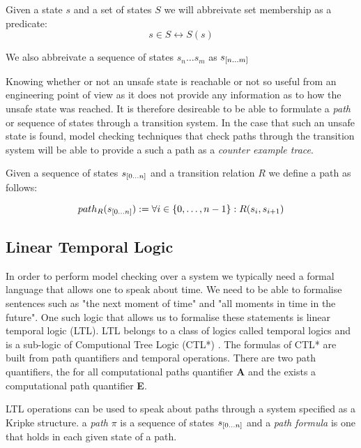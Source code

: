 \begin{myremark}
Given a state $s$ and a set of states $S$ we will abbreivate set membership as a predicate:
 $$s \in S \leftrightarrow S(s)$$

We also  abbreivate  a sequence of states $s_n \ldots s_m$ as $s_{{[}n \ldots m {]}}$

\end{myremark}
\medskip
Knowing whether or not an unsafe state is reachable or not so useful from an engineering point of view as it does not provide any information as to how the unsafe state was reached. It is therefore desireable to be able to formulate a \emph{path} or sequence of states through a transition system. In the case that such an unsafe state is found, model checking techniques that check paths through the transition system will be able to provide a such a path as a \emph{counter example trace}.
\medskip
\begin{mydef}[Path]
Given a sequence of states $s_{{[}0 \ldots n {]}}$ and a transition relation $R$ we define a path as follows:
 
$$path_R(s_{{[}0 \ldots n {]}})  := \forall i \in \{0, \ldots, n-1 \} : R(s_i, s_{i+1})$$

\end{mydef}
\medskip
\subsection*{Linear Temporal Logic}

In order to perform model checking over a system we typically need a formal language that allows one to speak about time. We need to be able to formalise sentences such as "the next moment of time" and "all moments in time in the future". One such logic that allows us to formalise these statements is linear temporal logic (LTL)\cite{AP77}.  LTL belongs to a class of logics called temporal logics and is a sub-logic of Computional Tree Logic (CTL*) \cite{EE86}. The formulas of CTL* are built from path quantifiers and temporal operations. There are two path quantifiers, the for all computational paths quantifier \textbf{A} and the exists a computational path quantifier \textbf{E}. 

LTL operations can be used to speak about paths through a system specified as a Kripke structure.
a \emph{path} $\pi$ is a sequence of states $s_{{[}0 \ldots n {]}}$ and a \emph{path formula} is one that holds in each given state of a path. 

